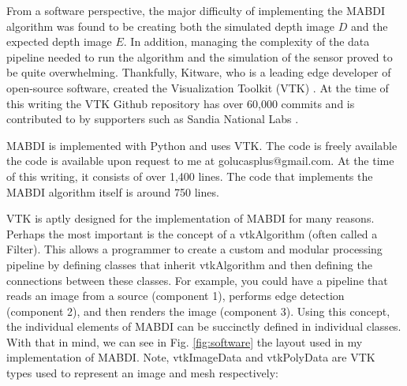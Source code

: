 From a software perspective, the major difficulty of implementing the MABDI
algorithm was found to be creating both the simulated depth image $D$ and the
expected depth image $E$. In addition, managing the complexity of the data
pipeline needed to run the algorithm and the simulation of the sensor proved to
be quite overwhelming. Thankfully, Kitware, who is a leading
edge developer of open-source software, created the Visualization Toolkit (VTK)
\cite{schroeder2004visualization, sitevtk}. At the time of this writing the VTK
Github repository has over 60,000 commits and is contributed to by supporters
such as Sandia National Labs \cite{sitevtkoverview}.

MABDI is implemented with Python and uses VTK. The code is freely available  the
code is available upon request to me at golucasplus@gmail.com. At the time of this
writing, it consists of over 1,400 lines. The code that implements the MABDI
algorithm itself is around 750 lines.

VTK is aptly designed for the implementation of MABDI for many reasons. Perhaps
the most important is the concept of a vtkAlgorithm (often called a Filter).
This allows a programmer to create a custom and modular processing pipeline by
defining classes that inherit vtkAlgorithm and then defining the connections
between these classes. For example, you could have a pipeline that reads an
image from a source (component 1), performs edge detection (component 2), and
then renders the image (component 3). Using this concept, the individual
elements of MABDI can be succinctly defined in individual classes. With that in
mind, we can see in Fig. \ref{fig:software} the layout used in my implementation
of MABDI. Note, vtkImageData and vtkPolyData are VTK types used to represent an
image and mesh respectively:

